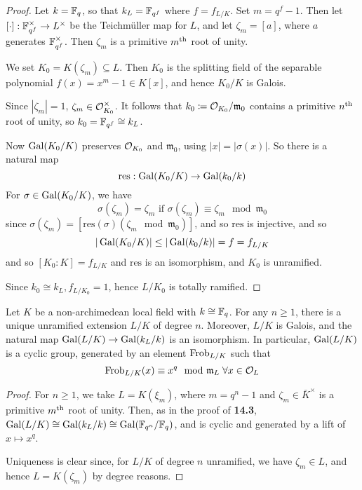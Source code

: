 \documentclass[10pt,a4paper]{article}
\begin{document}
\begin{proof}
  Let $k = \mathbb{F}_q$, so that $k_L = \mathbb{F}_{q^f}$ where $f = f_{L/K}$. Set $m = q^f-1$. Then let $[\cdot]:\mathbb{F}_{q^f}^\times \to L^\times$ be the Teichm\"uller map for $L$, and let $\zeta_m = [a]$, where $a$ generates $\mathbb{F}_{q^f}^\times$. Then $\zeta_m$ is a primitive $m\textsuperscript{th}$ root of unity.

  We set $K_0 = K(\zeta_m) \subseteq L$. Then $K_0$ is the splitting field of the separable polynomial $f(x) = x^m-1 \in K[x]$, and hence $K_0/K$ is Galois.

  Since $|\zeta_m| = 1$, $\zeta_m \in \mathcal{O}_{K_0}^\times$. It follows that $k_0 \coloneqq \mathcal{O}_{K_0}/\mathfrak{m}_0$ contains a primitive $n\textsuperscript{th}$ root of unity, so $k_0 = \mathbb{F}_{q^f} \cong k_L$.

  Now $\operatorname{Gal}(K_0/K)$ preserves $\mathcal{O}_{K_0}$ and $\mathfrak{m}_0$, using $|x| = |\sigma(x)|$. So there is a natural map
  \[\text{res}:\operatorname{Gal}(K_0/K) \to \operatorname{Gal}(k_0/k)\]
  For $\sigma \in \operatorname{Gal}(K_0/K)$, we have
  \[\sigma(\zeta_m) = \zeta_m\text{ if } \sigma(\zeta_m) \equiv \zeta_m \mod \mathfrak{m}_0\]
  since $\sigma(\zeta_m) = [\text{res}(\sigma)(\zeta_m \mod \mathfrak{m}_0)]$, and so $\text{res}$ is injective, and so
  \[|\operatorname{Gal}(K_0/K)| \leq |\operatorname{Gal}(k_0/k)| = f = f_{L/K}\]
  and so $[K_0:K] = f_{L/K}$ and $\text{res}$ is an isomorphism, and $K_0$ is unramified.

  Since $k_0 \cong k_L, f_{L/K_0} = 1$, hence $L/K_0$ is totally ramified.
\end{proof}
\begin{theorem}
  Let $K$ be a non-archimedean local field with $k \cong \mathbb{F}_q$. For any $n \geq 1$, there is a unique unramified extension $L/K$ of degree $n$. Moreover, $L/K$ is Galois, and the natural map $\operatorname{Gal}(L/K) \to \operatorname{Gal}(k_{L}/k)$ is an isomorphism. In particular, $\operatorname{Gal}(L/K)$ is a cyclic group, generated by an element $\operatorname{Frob}_{L/K}$ such that
  \[\Frob_{L/K}(x) \equiv x^q \mod \f{m}_L \forall x \in \O_L\]
\end{theorem}
\begin{proof}
  For $n \geq 1$, we take $L = K(\xi_m)$, where $m = q^n-1$ and $\zeta_m \in \bar{K}^\times$ is a primitive $m\textsuperscript{th}$ root of unity. Then, as in the proof of \textbf{14.3}, $\operatorname{Gal}(L/K) \cong \operatorname{Gal}(k_L/k) \cong \operatorname{Gal}(\mathbb{F}_{q^n}/\mathbb{F}_q)$, and is cyclic and generated by a lift of $x \mapsto x^q$.

  Uniqueness is clear since, for $L/K$ of degree $n$ unramified, we have $\zeta_m \in L$, and hence $L = K(\zeta_m)$ by degree reasons.
\end{proof}
\end{document}
